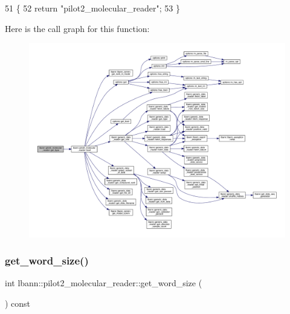\begin{DoxyCode}
51                                       \{
52     \textcolor{keywordflow}{return} \textcolor{stringliteral}{"pilot2\_molecular\_reader"};
53   \}
\end{DoxyCode}
Here is the call graph for this function\+:\nopagebreak
\begin{figure}[H]
\begin{center}
\leavevmode
\includegraphics[width=350pt]{classlbann_1_1pilot2__molecular__reader_a8548d10554c6e1ef921cf5d113530e72_cgraph}
\end{center}
\end{figure}
\mbox{\label{classlbann_1_1pilot2__molecular__reader_abba5a68c484be69a441e5e9711356a46}} 
\subsubsection{\texorpdfstring{get\+\_\+word\+\_\+size()}{get\_word\_size()}}
{\footnotesize\ttfamily int lbann\+::pilot2\+\_\+molecular\+\_\+reader\+::get\+\_\+word\+\_\+size (\begin{DoxyParamCaption}{ }\end{DoxyParamCaption}) const\hspace{0.3cm}{\ttfamily [inline]}}



